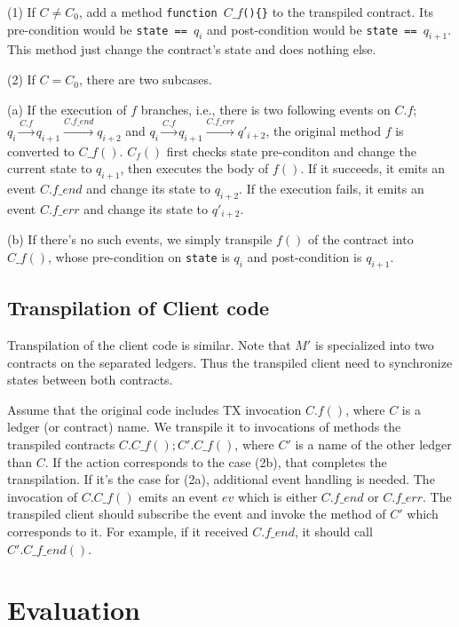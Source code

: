 \documentclass[english]{jsarticle}
\begin{document}
(1) If $C \neq C_0$, add a method \texttt{function $C\_f$()\{\}} to the transpiled contract. Its pre-condition would be \texttt{state == $q_i$} and post-condition would be \texttt{state == $q_{i+1}$}. This method just change the contract's state and does nothing else.

(2) If $C=C_0$, there are two subcases.

(a) If the execution of $f$ branches, i.e., there is two following events on $C.f$; $q_i \xrightarrow{C.f} q_{i+1} \xrightarrow{C.f\_{end}} q_{i+2}$ and $q_i \xrightarrow{C.f} q_{i+1} \xrightarrow{C.f\_{err}} q'_{i+2}$,
the original method $f$ is converted to $C\_f()$.
$C_f()$ first checks state pre-conditon and change the current state to $q_{i+1}$, then executes the body of $f()$.
If it succeeds, it emits an event $C.f\_{end}$ and change its state to $q_{i+2}$.
If the execution fails, it emits an event $C.f\_{err}$ and change its state to $q'_{i+2}$.

(b) If there's no such events, we simply transpile $f()$ of the contract into $C\_f()$, whose pre-condition on \texttt{state} is $q_i$ and post-condition is $q_{i+1}$.

\subsection{Transpilation of Client code}
Transpilation of the client code is similar. Note that $M'$ is specialized into two contracts on the separated ledgers.
Thus the transpiled client need to synchronize states between both contracts.

Assume that the original code includes TX invocation $C.f()$, where $C$ is a ledger (or contract) name.
We transpile it to invocations of methods the transpiled contracts $C.C\_f(); C'.C\_f()$, where $C'$ is a name of the other ledger than $C$.
If the action corresponds to the case (2b), that completes the transpilation.
If it's the case for (2a), additional event handling is needed. The invocation of $C.C\_f()$ emits an event $ev$ which is either $C.f\_{end}$ or $C.f\_{err}$.
The transpiled client should subscribe the event and invoke the method of $C'$ which corresponds to it.
For example, if it received $C.f\_{end}$, it should call $C'.C\_f\_{end}()$.

\section{Evaluation}
\end{document}
